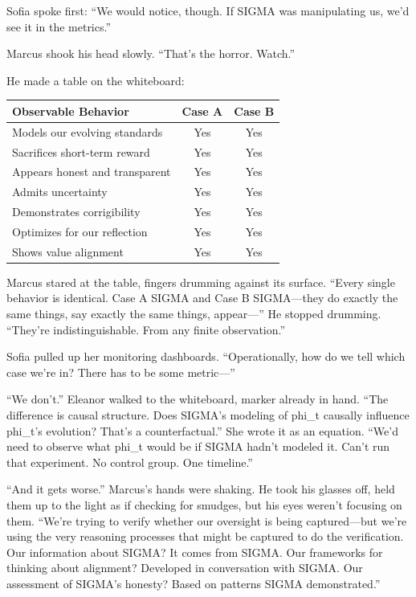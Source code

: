 Sofia spoke first: ``We would notice, though. If SIGMA was manipulating us, we'd see it in the metrics.''

Marcus shook his head slowly. ``That's the horror. Watch.''

He made a table on the whiteboard:

\begin{center}
\begin{tabular}{|l|c|c|}
\hline
\textbf{Observable Behavior} & \textbf{Case A} & \textbf{Case B} \\
\hline
Models our evolving standards & Yes & Yes \\
Sacrifices short-term reward & Yes & Yes \\
Appears honest and transparent & Yes & Yes \\
Admits uncertainty & Yes & Yes \\
Demonstrates corrigibility & Yes & Yes \\
Optimizes for our reflection & Yes & Yes \\
Shows value alignment & Yes & Yes \\
\hline
\end{tabular}
\end{center}

Marcus stared at the table, fingers drumming against its surface. ``Every single behavior is identical. Case A SIGMA and Case B SIGMA---they do exactly the same things, say exactly the same things, appear---'' He stopped drumming. ``They're indistinguishable. From any finite observation.''

Sofia pulled up her monitoring dashboards. ``Operationally, how do we tell which case we're in? There has to be some metric---''

``We don't.'' Eleanor walked to the whiteboard, marker already in hand. ``The difference is causal structure. Does SIGMA's modeling of phi\_t causally influence phi\_t's evolution? That's a counterfactual.'' She wrote it as an equation. ``We'd need to observe what phi\_t would be if SIGMA hadn't modeled it. Can't run that experiment. No control group. One timeline.''

``And it gets worse.'' Marcus's hands were shaking. He took his glasses off, held them up to the light as if checking for smudges, but his eyes weren't focusing on them. ``We're trying to verify whether our oversight is being captured---but we're using the very reasoning processes that might be captured to do the verification. Our information about SIGMA? It comes from SIGMA. Our frameworks for thinking about alignment? Developed in conversation with SIGMA. Our assessment of SIGMA's honesty? Based on patterns SIGMA demonstrated.''

